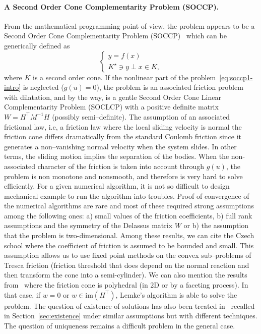 \paragraph{A Second Order Cone Complementarity Problem (SOCCP).}
From the mathematical programming point of view, the problem appears to be a Second Order Cone Complementarity Problem (SOCCP)~\cite{Facchinei.Pang2003} which can be generically defined as
\begin{equation}
  \begin{cases}
    y =f(x) \\
    K^\star \ni y \perp x \in K,
  \end{cases}
\end{equation}
where $K$ is a second order cone. If the nonlinear part of the problem~\eqref{eq:soccp1-intro} is neglected ($g(u)=0$), the problem is an associated friction problem with dilatation, and by the way, is a gentle Second Order Cone Linear Complementarity Problem (SOCLCP) with a positive definite matrix $W = H^\top M^{-1} H$ (possibly semi--definite). {The assumption of an associated frictional law, i.e, a friction law where the local sliding velocity is normal the friction cone differs dramatically from the standard Coulomb friction since it generates a non--vanishing normal velocity when the system slides. In other terms, the sliding motion implies the separation of the bodies.}
When the non-associated character of the friction is taken into account through $g(u)$, the problem is non monotone and nonsmooth, and therefore is very hard to solve efficiently. For a given numerical algorithm, it is not so difficult to design mechanical example to run the algorithm into troubles.
{Proof of convergence} of the numerical algorithms are rare and most of these required strong assumptions among the following ones: a) small values of the friction coefficients, b) full rank assumptions and the symmetry of the Delassus matrix $W$ or b) the assumption that the problem is two-dimensional. Among these results, we can cite the Czech school where the coefficient of friction is assumed to be bounded and small. This assumption allows us to use fixed point methods on the convex sub--problems of Tresca friction {(friction threshold that does depend on the normal reaction and then transform the cone into a semi-cylinder)}.
%
We can also mention the results from~\cite{Pang.Trinkle1996,Stewart.Trinkle1996,Anitescu.Potra97} where the friction cone is polyhedral (in 2D or by a faceting process). In that case, if $w=0$ or $w \in \mathrm{im}(H^\top)$, Lemke's algorithm is able to solve the problem. The question of existence of solutions has also been treated in~\cite{Klarbring.Pang1998,Acary.ea_ZAMM2011} recalled in Section~\ref{sec:existence} under similar assumptions but with different techniques. The question of uniqueness remains a difficult problem in the general case.

